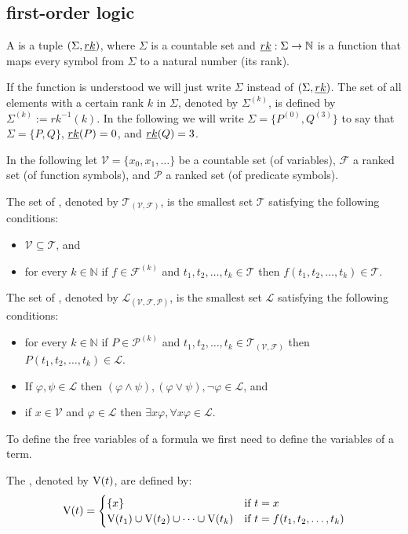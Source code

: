 \subsection{first-order logic}
\begin{definition}
A  is a tuple $(\Sigma,\emph{rk})$, where $\Sigma$ is a countable set and $\emph{rk}:\Sigma\to\mathbb{N}$ is a function that maps every symbol from $\Sigma$ to a natural number (its rank).
\end{definition}
If the function \rank{} is understood we will just write $\Sigma$ instead of $(\Sigma,\emph{rk})$. The set of all elements with a certain rank $k$ in $\Sigma$, denoted by $\Sigma^{(k)}$, is defined by $\Sigma^{(k)}:=rk^{-1}(k)$. In the following we will write $\Sigma=\{P^{(0)},Q^{(3)}\}$ to say that $\Sigma=\{P,Q\}$, $\emph{rk}(P)=0$, and $\emph{rk}(Q)=3$.

In the following let $\mathcal{V}=\{x_0,x_1,\dots\}$ be a countable set (of variables), $\mathcal{F}$ a ranked set (of function symbols), and $\mathcal{P}$ a ranked set (of predicate symbols).
\begin{definition}
The set of , denoted by $\mathcal{T}_{(\mathcal{V},\mathcal{F})}$, is the smallest set $\mathcal{T}$ satisfying the following conditions:
\begin{itemize}
\item $\mathcal{V} \subseteq \mathcal{T}$, and
\item for every $k\in\mathbb{N}$ if $f\in\mathcal{F}^{(k)}$ and $t_1,t_2,\dots,t_k\in\mathcal{T}$ then $f(t_1,t_2,\dots,t_k)\in\mathcal{T}$.
\end{itemize}
The set of , denoted by $\mathcal{L}_{(\mathcal{V},\mathcal{F},\mathcal{P})}$, is the smallest set $\mathcal{L}$ satisfying the following conditions:
\begin{itemize}
\item for every $k\in\mathbb{N}$ if $P\in\mathcal{P}^{(k)}$ and $t_1,t_2,\dots,t_k\in\mathcal{T}_{(\mathcal{V},\mathcal{F})}$ then $P(t_1,t_2,\dots,t_k)\in\mathcal{L}$.
\item If $\varphi,\psi\in\mathcal{L}$ then $(\varphi\wedge\psi), (\varphi\vee\psi), \neg \varphi\in\mathcal{L}$, and
\item if $x\in\mathcal{V}$ and $\varphi\in\mathcal{L}$ then $\exists x\varphi,\forall x\varphi\in\mathcal{L}$. %
\end{itemize}
\end{definition}
To define the free variables of a formula we first need to define the variables of a term.
\begin{definition}
The , denoted by $\text{V}(t)$, are defined by:
\[\V(t)=
\begin{cases}
\{x\} & \text{if $t=x$}\\ %
\V(t_1)\cup \V(t_2)\cup\dots\cup \V(t_k) & \text{if $t=f(t_1,t_2,\dots,t_k)$}
\end{cases}\]
\end{definition}

